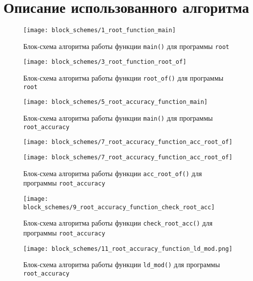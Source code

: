 \section{Описание использованного алгоритма}

\begin{figure}[H]
  \centering
  \texttt{[image: block\_schemes/1\_root\_function\_main]}
  \caption{Блок-схема алгоритма работы функции \texttt{main()} для программы \texttt{root}}
\end{figure}

\begin{figure}[H]
  \centering
  \texttt{[image: block\_schemes/3\_root\_function\_root\_of]}
  \caption{Блок-схема алгоритма работы функции \texttt{root\_of()} для программы \texttt{root}}
\end{figure}

\begin{figure}[H]
  \centering
  \texttt{[image: block\_schemes/5\_root\_accuracy\_function\_main]}
  \caption{Блок-схема алгоритма работы функции \texttt{main()} для программы \texttt{root\_accuracy}}
\end{figure}

\begin{figure}[H]
  \centering
  \texttt{[image: block\_schemes/7\_root\_accuracy\_function\_acc\_root\_of]}
\end{figure}

\begin{figure}[H]
\ContinuedFloat
  \centering
  \texttt{[image: block\_schemes/7\_root\_accuracy\_function\_acc\_root\_of]}
  \caption{Блок-схема алгоритма работы функции \texttt{acc\_root\_of()} для программы \texttt{root\_accuracy}}
\end{figure}

\begin{figure}[H]
  \centering
  \texttt{[image: block\_schemes/9\_root\_accuracy\_function\_check\_root\_acc]}
  \caption{Блок-схема алгоритма работы функции \texttt{check\_root\_acc()} для программы \texttt{root\_accuracy}}
\end{figure}

\begin{figure}[H]
  \centering
  \texttt{[image: block\_schemes/11\_root\_accuracy\_function\_ld\_mod.png]}
  \caption{Блок-схема алгоритма работы функции \texttt{ld\_mod()} для программы \texttt{root\_accuracy}}
\end{figure}
